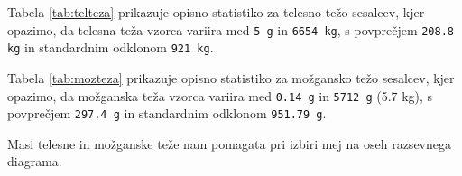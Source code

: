 Tabela \ref{tab:telteza} prikazuje opisno statistiko za telesno težo sesalcev, kjer opazimo, da telesna teža vzorca
variira med \verb|5 g| in \verb|6654 kg|, s povprečjem \verb|208.8 kg| in standardnim odklonom \verb|921 kg|.

Tabela \ref{tab:mozteza} prikazuje opisno statistiko za možgansko težo sesalcev, kjer opazimo, da možganska teža vzorca
variira med \verb|0.14 g| in \verb|5712 g| (5.7 kg), s povprečjem \verb|297.4 g| in standardnim odklonom \verb|951.79 g|.

Masi telesne in možganske teže nam pomagata pri izbiri mej na oseh razsevnega diagrama.